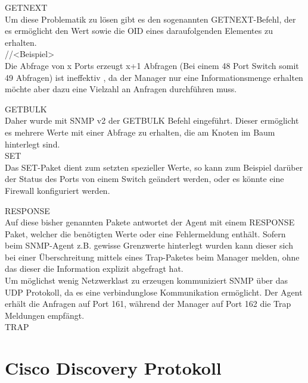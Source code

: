 GETNEXT\\

Um diese Problematik zu lösen gibt es den sogenannten GETNEXT-Befehl, der es ermöglicht den Wert sowie die OID eines daraufolgenden Elementes zu erhalten.\\
//<Beispiel>\\

Die Abfrage von x Ports erzeugt x+1 Abfragen (Bei einem 48 Port Switch somit 49 Abfragen) ist ineffektiv , da der Manager nur eine Informationsmenge erhalten möchte aber dazu eine Vielzahl an Anfragen durchführen muss.

GETBULK\\
Daher wurde mit SNMP v2 der GETBULK Befehl eingeführt. Dieser ermöglicht es mehrere Werte mit einer Abfrage zu erhalten, die am Knoten im Baum hinterlegt sind.\\

SET\\
Das SET-Paket dient zum setzten spezieller Werte, so kann zum Beispiel darüber der Status des Ports von einem Switch  geändert werden, oder es könnte eine Firewall konfiguriert werden.

RESPONSE\\
Auf diese bisher genannten Pakete antwortet der Agent mit einem RESPONSE Paket, welcher die benötigten Werte oder eine Fehlermeldung enthält.
Sofern beim SNMP-Agent z.B. gewisse Grenzwerte hinterlegt wurden kann dieser sich bei einer Überschreitung mittels eines Trap-Paketes beim Manager melden, ohne das dieser die Information explizit abgefragt hat.\\
Um möglichst wenig Netzwerklast zu erzeugen kommuniziert SNMP über das UDP Protokoll, da es eine verbindunglose Kommunikation ermöglicht. Der Agent erhält die Anfragen auf Port 161, während der Manager auf Port 162 die Trap Meldungen empfängt.\\
TRAP\\





\section{Cisco Discovery Protokoll}
\label{sec:cdp}

